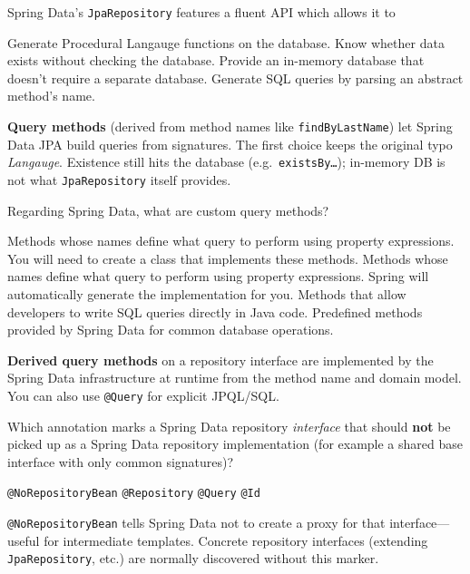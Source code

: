 \question[4]
Spring Data's \texttt{JpaRepository} features a fluent API which allows it to
\begin{choices}
  \choice Generate Procedural Langauge functions on the database.
  \choice Know whether data exists without checking the database.
  \choice Provide an in-memory database that doesn't require a separate database.
  \CorrectChoice Generate SQL queries by parsing an abstract method's name.
\end{choices}
\begin{solution}
  \textbf{Query methods} (derived from method names like \texttt{findByLastName}) let Spring Data JPA build queries from signatures. The first choice keeps the original typo \textit{Langauge}. Existence still hits the database (e.g.\ \texttt{existsBy\ldots}); in-memory DB is not what \texttt{JpaRepository} itself provides.
\end{solution}

\question[4]
Regarding Spring Data, what are custom query methods?
\begin{choices}
  \choice Methods whose names define what query to perform using property expressions. You will need to create a class that implements these methods.
  \CorrectChoice Methods whose names define what query to perform using property expressions. Spring will automatically generate the implementation for you.
  \choice Methods that allow developers to write SQL queries directly in Java code.
  \choice Predefined methods provided by Spring Data for common database operations.
\end{choices}
\begin{solution}
  \textbf{Derived query methods} on a repository interface are implemented by the Spring Data infrastructure at runtime from the method name and domain model. You can also use \texttt{@Query} for explicit JPQL/SQL.
\end{solution}


\question[4]
Which annotation marks a Spring Data repository \emph{interface} that should \textbf{not} be picked up as a Spring Data repository implementation (for example a shared base interface with only common signatures)?
\begin{choices}
  \CorrectChoice \texttt{@NoRepositoryBean}
  \choice \texttt{@Repository}
  \choice \texttt{@Query}
  \choice \texttt{@Id}
\end{choices}
\begin{solution}
  \texttt{@NoRepositoryBean} tells Spring Data not to create a proxy for that interface---useful for intermediate templates. Concrete repository interfaces (extending \texttt{JpaRepository}, etc.) are normally discovered without this marker.
\end{solution}


